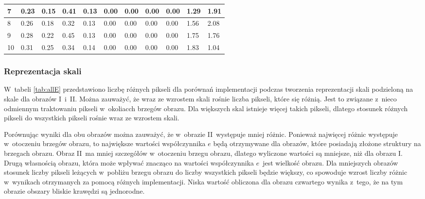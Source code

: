 {\begin{landscape}
\begin{table}[h]
\begin{tabular}{|p{0.8cm}|p{1.8cm}|p{1.8cm}|p{1.8cm}|p{1.8cm}|p{1.8cm}|p{1.8cm}|p{1.8cm}|p{1.8cm}|p{1.8cm}|p{1.8cm}|}
\multicolumn{1}{|l|}{7}        & 0.23                   & 0.15                   & 0.41                 & 0.13        & 0.00              & 0.00               & 0.00               & 0.00                & 1.29              & 1.91                    \\ \hline
\multicolumn{1}{|l|}{8}        & 0.26                   & 0.18                   & 0.32                 & 0.13        & 0.00              & 0.00               & 0.00               & 0.00                & 1.56              & 2.08                    \\ \hline
\multicolumn{1}{|l|}{9}        & 0.28                   & 0.22                   & 0.45                 & 0.13        & 0.00              & 0.00               & 0.00               & 0.00                & 1.75              & 1.76                    \\ \hline
\multicolumn{1}{|l|}{10}       & 0.31                   & 0.25                   & 0.34                 & 0.14        & 0.00              & 0.00               & 0.00               & 0.00                & 1.83              & 1.04                    \\ \hline
\end{tabular}
\end{table}
\end{landscape}}

\subsubsection{Reprezentacja skali}
\label{subsubsec:reprezentacjaSakliTabele}

W~tabeli \ref{tab:allE} przedstawiono liczbę różnych pikseli dla porównań implementacji podczas tworzenia reprezentacji skali podzieloną na skale dla obrazów I~i~II. Można zauważyć, że wraz ze wzrostem skali rośnie liczba pikseli, które się różnią. Jest to związane z~nieco odmiennym traktowaniu pikseli w~okoliacch brzegów obrazu. Dla większych skal istnieje więcej takich pikseli, dlatego stosunek różnych pikseli do wszystkich pikseli rośnie wraz ze wzrostem skali.

Porównując wyniki dla obu obrazów można zauważyć, że w~obrazie II~występuje mniej różnic. Ponieważ najwięcej różnic występuje w~otoczeniu brzegów obrazu, to największe wartości współczynnika $ e $ będą otrzymywane dla obrazów, które posiadają złożone struktury na brzegach obrazu. Obraz II~ma mniej szczegółów w~otoczeniu brzegu obrazu, dlatego wyliczone wartości są mniejsze, niż dla obrazu I. Drugą własnością obrazu, która może wpływać znacząco na wartości współczynnika $ e $~jest wielkość obrazu. Dla mniejszych obrazów stosunek liczby pikseli leżących w~pobliżu brzegu obrazu do liczby wszystkich pikseli będzie większy, co spowoduje wzrost liczby różnic w~wynikach otrzymanych za pomocą różnych implementacji. Niska wartość obliczona dla obrazu czwartego wynika z~tego, że na tym obrazie obszary bliskie krawędzi są jednorodne.

